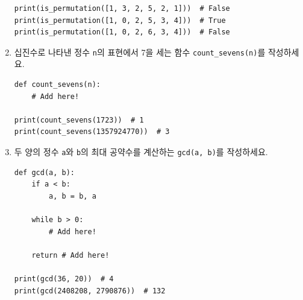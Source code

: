 \documentclass[../main.tex]{subfiles}
\begin{document}
\begin{enumerate}
\begin{verbatim}
print(is_permutation([1, 3, 2, 5, 2, 1]))  # False
print(is_permutation([1, 0, 2, 5, 3, 4]))  # True
print(is_permutation([1, 0, 2, 6, 3, 4]))  # False
\end{verbatim}

\item 십진수로 나타낸 정수 \verb/n/의 표현에서 7을 세는 함수 \texttt{count\_sevens(n)}를 작성하세요.
\begin{verbatim}
def count_sevens(n):
    # Add here!

print(count_sevens(1723))  # 1
print(count_sevens(1357924770))  # 3
\end{verbatim}

\item 두 양의 정수 \verb/a/와 \verb/b/의 최대 공약수를 계산하는 \texttt{gcd(a, b)}를 작성하세요.
\begin{verbatim}
def gcd(a, b):
    if a < b:
        a, b = b, a

    while b > 0:
        # Add here!

    return # Add here!

print(gcd(36, 20))  # 4
print(gcd(2408208, 2790876))  # 132
\end{verbatim}
\end{enumerate}
\end{document}
